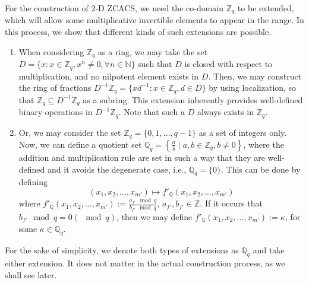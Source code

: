 \documentclass[pdflatex,sn-mathphys-num]{sn-jnl}%
\theoremstyle{thmstyleone}
\begin{document}
	
	For the construction of 2-D ZCACS, we need the co-domain $\mathbb{Z}_q$ to be extended, which will allow some multiplicative invertible elements to appear in the range. In this process, we show that different kinds of such extensions are possible. 
	\begin{enumerate}
		\item When considering $\mathbb{Z}_q$ as a ring, we may take the set $D= \{x: x \in \mathbb{Z}_q, x^n \neq 0, \forall n \in \mathbb{N}\}$ such that $D$ is closed with respect to multiplication, and no nilpotent element exists in $D$. Then, we may construct the ring of fractions $D^{-1} \mathbb{Z}_q = \{x d^{-1}: x \in \mathbb{Z}_q, d \in D\}$ by using localization, so that $\mathbb{Z}_q \subseteq D^{-1} \mathbb{Z}_q$ as a subring. This extension inherently provides well-defined binary operations in $D^{-1} \mathbb{Z}_q$. Note that such a $D$ always exists in $\mathbb{Z}_q$.
		
		\item Or, we may consider the set $\mathbb{Z}_q=\{0,1, \dots, q-1\}$ as a set of integers only. Now, we can define a quotient set $\mathbb{Q}_q=\left\{\frac{a}{b} \mid a, b \in \mathbb{Z}_q, b \neq 0\right\}$, where the addition and multiplication rule are set in such a way that they are well-defined and it avoids the degenerate case, i.e., $\mathbb{Q}_q= \{0\}$. 
		This can be done by defining 
		\begin{equation}
			(x_1, x_2, \dots, x_{m'}) \mapsto f'_{\mathbb{Q}} (x_1, x_2, \dots, x_{m'})
		\end{equation}
		where $f'_{\mathbb{Q}} (x_1, x_2, \dots, x_{m'}):= \frac{a_{f'} \mod q}{b_{f'} \mod q}$, $a_{f'}, b_{f'} \in \mathbb{Z}$. If it occurs that 
		$b_{f'} \mod q = 0 (\mod q)$, then we may define $f'_{\mathbb{Q}} (x_1, x_2, \dots, x_{m'}):= \kappa$, for some $\kappa \in \mathbb{Q}_q$.
	\end{enumerate}
	For the sake of simplicity, we denote both types of extensions as $\mathbb{Q}_q$ and take either extension. It does not matter in the actual construction process, as we shall see later.
	
\end{document}
